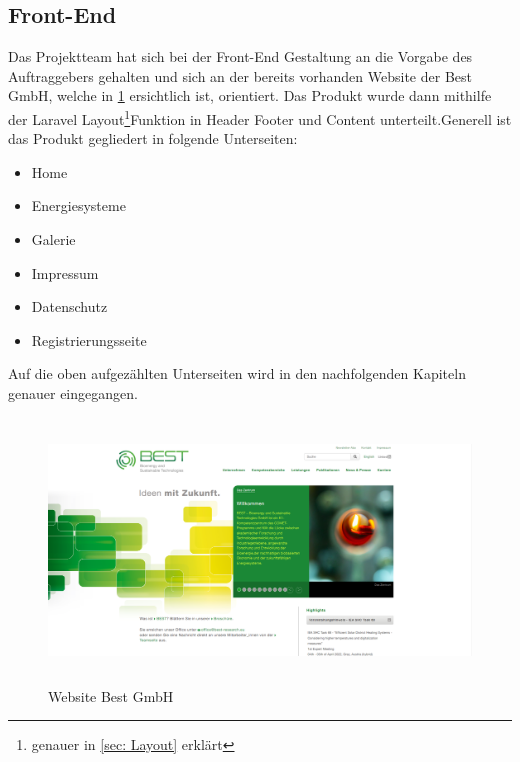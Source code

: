\subsection{Front-End} \label{sec: Front-End}
Das Projektteam hat sich bei der Front-End Gestaltung an die Vorgabe des Auftraggebers gehalten und sich an der bereits vorhanden Website der Best GmbH, welche in \ref{fig:Website Best GmbH} ersichtlich ist, orientiert. Das Produkt wurde dann mithilfe der Laravel Layout\footnote{genauer in \autoref{sec: Layout} erklärt }\space Funktion in Header Footer und Content unterteilt.Generell ist das Produkt gegliedert in folgende Unterseiten: 
\begin{itemize}
	\item Home 
	\item Energiesysteme
	\item Galerie 
	\item Impressum 
	\item Datenschutz
	\item Registrierungsseite
\end{itemize}
Auf die oben aufgezählten Unterseiten wird in den nachfolgenden Kapiteln genauer eingegangen.
\begin{figure}[h]
	\centering
	\includegraphics[height=7cm,width=15cm]{images/BestGmbHSeite}
	\caption{Website Best GmbH}
	\label{fig:Website Best GmbH}
\end{figure}
\newpage

